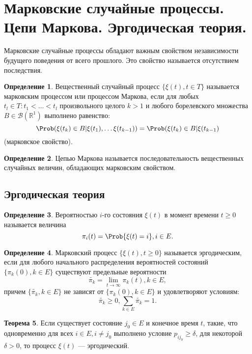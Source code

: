 \documentclass[12pt]{report}
\theoremstyle{definition}
\newtheorem{theorem}{Теорема}[chapter]
\newtheorem{definition}[theorem]{Определение}
\newcommand{\R}{\mathbb R}
\newcommand{\B}{\mathcal B}
\begin{document}


\section
{
  Марковские случайные процессы. Цепи Маркова.
  Эргодическая теория.
}

Марковские случайные процессы обладают важным свойством независимости
будущего поведения от всего прошлого. Это свойство называется отсутствием
последствия.

\begin{definition}
Вещественный случайный процесс $\{\xi(t), t \in T\}$ называется марковским
процессом или процессом Маркова, если для любых $t_l \in T: t_1 < \dots < t_l$
произвольного целого $k > 1$ и любого борелевского множества $B \in \B(\R^1)$
выполнено равенство:
$$
\Prob(\xi(t_k) \in B| \xi(t_1), \dots \xi(t_{k-1})) =
\Prob(\xi(t_k) \in B|\xi(t_{k-1})
$$ (марковское свойство).
\end{definition}

\begin{definition}
Цепью Маркова называется последовательность вещественных случайных
величин, обладающих марковским свойством.
\end{definition}

\subsection{Эргодическая теория}

\begin{definition}
Вероятностью $i$-го состояния $\xi(t)$ в момент времени $t \ge 0$
называется величина
$$
\pi_i(t) = \Prob\{ \xi(t) = i\}, i \in E.
$$ 
\end{definition}

\begin{definition}
Марковский процесс $\{\xi(t), t \ge 0\}$ называется эргодическим, если для
любого начального распределения вероятностей состояний $\{\pi_k(0), k \in E\}$
существуют предельные вероятности
$$
\widetilde{\pi_k} = \lim\limits_{t \rightarrow \infty} \pi_k(t), k \in E,
$$
причем $\{\widetilde{\pi_k}, k \in E\}$ не зависят от $\{\pi_k(0), k \in E\}$
и удовлетворяют условиям:
$$
\widetilde{\pi_k} \ge 0, \sum\limits_{k \in E} \widetilde{\pi_k} = 1.
$$
\end{definition}

\begin{theorem}
Если существует состояние $j_0 \in E$ и конечное время $t$, такие, что 
одновременно для всех $i \in E, i \ne j_0$ выполнено условие 
$p_{ij_0} \ge \delta$, для некоторой $\delta > 0$, то процесс
$\xi(t)$ --- эргодический.
\end{theorem}
\end{document}

